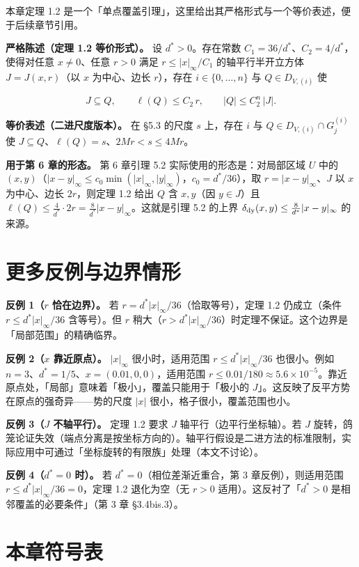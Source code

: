 \documentclass[a4paper,11pt,openany]{ctexbook}
\numberwithin{equation}{chapter}
\numberwithin{figure}{chapter}
\numberwithin{table}{chapter}
\begin{document}
本章定理 1.2 是一个「单点覆盖引理」，这里给出其严格形式与一个等价表述，便于后续章节引用。

\textbf{严格陈述（定理 1.2 等价形式）。} 设 $d^*>0$。存在常数 $C_1=36/d^*$、$C_2=4/d^*$，使得对任意 $x\neq0$、任意 $r>0$ 满足 $r\le|x|_\infty/C_1$ 的轴平行半开立方体 $J=J(x,r)$（以 $x$ 为中心、边长 $r$），存在 $i\in\{0,\dots,n\}$ 与 $Q\in D_{V,(i)}$ 使

$$J\subseteq Q,\qquad \ell(Q)\le C_2\, r,\qquad |Q|\le C_2^n\,|J|.$$

\textbf{等价表述（二进尺度版本）。} 在 §5.3 的尺度 $s$ 上，存在 $i$ 与 $Q\in D_{V,(i)}\cap G_j^{(i)}$ 使 $J\subseteq Q$、$\ell(Q)=s$、$2Mr<s\le4Mr$。

\textbf{用于第 6 章的形态。} 第 6 章引理 5.2 实际使用的形态是：对局部区域 $U$ 中的 $(x,y)$（$|x-y|_\infty\le c_0\min(|x|_\infty,|y|_\infty)$，$c_0=d^*/36$），取 $r=|x-y|_\infty$、$J$ 以 $x$ 为中心、边长 $2r$，则定理 1.2 给出 $Q$ 含 $x,y$（因 $y\in J$）且 $\ell(Q)\le\frac4{d^*}\cdot2r=\frac8{d^*}|x-y|_\infty$。这就是引理 5.2 的上界 $\delta_{\rm dy}(x,y)\le\frac8{d^*}|x-y|_\infty$ 的来源。

\section{更多反例与边界情形}

\textbf{反例 1（$r$ 恰在边界）。} 若 $r=d^*|x|_\infty/36$（恰取等号），定理 1.2 仍成立（条件 $r\le d^*|x|_\infty/36$ 含等号）。但 $r$ 稍大（$r>d^*|x|_\infty/36$）时定理不保证。这个边界是「局部范围」的精确临界。

\textbf{反例 2（$x$ 靠近原点）。} $|x|_\infty$ 很小时，适用范围 $r\le d^*|x|_\infty/36$ 也很小。例如 $n=3$、$d^*=1/5$、$x=(0.01,0,0)$，适用范围 $r\le0.01/180\approx5.6\times10^{-5}$。靠近原点处，「局部」意味着「极小」，覆盖只能用于「极小的 $J$」。这反映了反平方势在原点的强奇异——势的尺度 $|x|$ 很小，格子很小，覆盖范围也小。

\textbf{反例 3（$J$ 不轴平行）。} 定理 1.2 要求 $J$ 轴平行（边平行坐标轴）。若 $J$ 旋转，鸽笼论证失效（端点分离是按坐标方向的）。轴平行假设是二进方法的标准限制，实际应用中可通过「坐标旋转的有限族」处理（本文不讨论）。

\textbf{反例 4（$d^*=0$ 时）。} 若 $d^*=0$（相位差渐近重合，第 3 章反例），则适用范围 $r\le d^*|x|_\infty/36=0$，定理 1.2 退化为空（无 $r>0$ 适用）。这反衬了「$d^*>0$ 是相邻覆盖的必要条件」（第 3 章 §3.4bis.3）。

\section{本章符号表}
\end{document}
